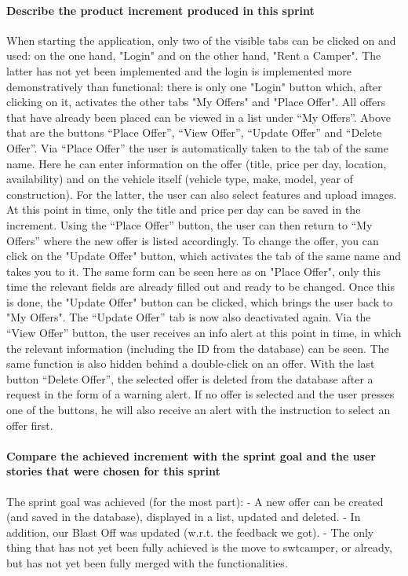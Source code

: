 \paragraph{Describe the product increment produced in this sprint}
When starting the application, only two of the visible tabs can be clicked on and used: on the
one hand, "Login" and on the other hand, "Rent a Camper". The latter has not yet been
implemented and the login is implemented more demonstratively than functional: there is
only one "Login" button which, after clicking on it, activates the other tabs "My Offers" and
"Place Offer". All offers that have already been placed can be viewed in a list under “My
Offers”. Above that are the buttons “Place Offer”, “View Offer”, “Update Offer” and “Delete
Offer”.
Via “Place Offer” the user is automatically taken to the tab of the same name. Here he can
enter information on the offer (title, price per day, location, availability) and on the vehicle
itself (vehicle type, make, model, year of construction). For the latter, the user can also select
features and upload images.
At this point in time, only the title and price per day can be saved in the increment.
Using the “Place Offer” button, the user can then return to “My Offers” where the new offer
is listed accordingly.
To change the offer, you can click on the "Update Offer" button, which activates the tab of
the same name and takes you to it. The same form can be seen here as on "Place Offer", only
this time the relevant fields are already filled out and ready to be changed. Once this is done,
the "Update Offer" button can be clicked, which brings the user back to "My Offers". The
“Update Offer” tab is now also deactivated again.
Via the “View Offer” button, the user receives an info alert at this point in time, in which the
relevant information (including the ID from the database) can be seen. The same function is
also hidden behind a double-click on an offer.
With the last button “Delete Offer”, the selected offer is deleted from the database after a
request in the form of a warning alert.
If no offer is selected and the user presses one of the buttons, he will also receive an alert
with the instruction to select an offer first.

\paragraph{Compare the achieved increment with the sprint goal and the user stories that were chosen for this sprint}
The sprint goal was achieved (for the most part):
- A new offer can be created (and saved in the database), displayed in a list, updated and
deleted.
- In addition, our Blast Off was updated (w.r.t. the feedback we got).
- The only thing that has not yet been fully achieved is the move to swtcamper, or
already, but has not yet been fully merged with the functionalities.

